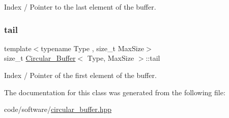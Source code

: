 Index / Pointer to the last element of the buffer. 

\mbox{\label{classCircular__Buffer_a6eb4d6b77a513a6b9bd8465197e48ad4}} 
\subsubsection{\texorpdfstring{tail}{tail}}
{\footnotesize\ttfamily template$<$typename Type , size\+\_\+t Max\+Size$>$ \\
size\+\_\+t \hyperlink{classCircular__Buffer}{Circular\+\_\+\+Buffer}$<$ Type, Max\+Size $>$\+::tail\hspace{0.3cm}{\ttfamily [private]}}



Index / Pointer of the first element of the buffer. 



The documentation for this class was generated from the following file\+:\begin{DoxyCompactItemize}
\item 
code/software/\hyperlink{circular__buffer_8hpp}{circular\+\_\+buffer.\+hpp}\end{DoxyCompactItemize}
